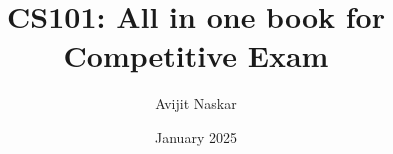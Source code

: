 \documentclass[a4paper,10pt,twoside]{book}
\begin{document}
\author{Avijit Naskar}
\title{CS101: All in one book for Competitive Exam}
\date{January 2025}

\frontmatter
\maketitle
\tableofcontents
\mainmatter












\backmatter
\printbibliography
\end{document}
